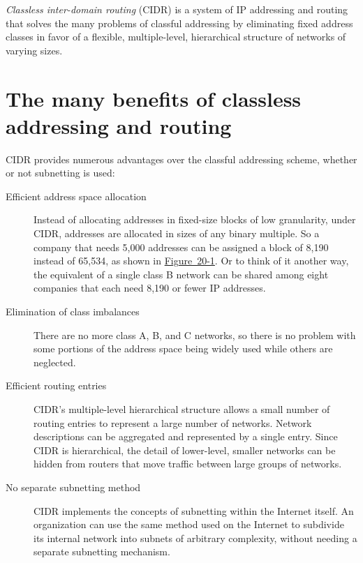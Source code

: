\begin{keyconcept}
\emph{Classless inter-domain routing} (CIDR) is a system of IP addressing and routing that solves the many problems of
classful addressing by eliminating fixed address classes in favor of a flexible, multiple-level, hierarchical structure of networks of varying sizes.
\end{keyconcept}

\section{The many benefits of classless addressing and routing}

CIDR provides numerous advantages over the classful addressing scheme, whether or not subnetting is used:

\begin{description}
   \item[Efficient address space allocation]
      Instead of allocating addresses in fixed-size blocks of low granularity, under CIDR, addresses are allocated in sizes of any binary multiple.
      So a company that needs 5,000 addresses can be assigned a block of 8,190 instead of 65,534, as shown in \protect\hyperlink{ch20.htmlux5cux23classless_addressing_cidr_solves_the_gra}{Figure~20-1}.
      Or to think of it another way, the equivalent of a single class B network can be shared among eight companies that each need 8,190 or fewer IP addresses.

   \item[Elimination of class imbalances]
      There are no more class A, B, and C networks, so there is no problem with some portions of the address space being widely used while others are neglected.

   \item[Efficient routing entries]
      CIDR's multiple-level hierarchical structure allows a small number of routing entries to represent a large number of networks.
      Network descriptions can be aggregated and represented by a single entry.
      Since CIDR is hierarchical, the detail of lower-level, smaller networks can be hidden from routers that move traffic between large groups of networks.

   \item[No separate subnetting method]
      CIDR implements the concepts of subnetting within the Internet itself.
      An organization can use the same method used on the Internet to subdivide its internal network into subnets of arbitrary complexity,
      without needing a separate subnetting mechanism.
\end{description}



